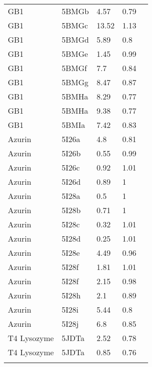 \begin{center}
\begin{tabular}{l l l l r}
GB1         & 5BMGb & 4.57  & 0.79 & \citep*{Cunningham2016} \\ 
GB1         & 5BMGc & 13.52 & 1.13 & \citep*{Cunningham2016} \\ 
GB1         & 5BMGd & 5.89  & 0.8  & \citep*{Cunningham2016} \\ 
GB1         & 5BMGe & 1.45  & 0.99 & \citep*{Cunningham2016} \\ 
GB1         & 5BMGf & 7.7   & 0.84 & \citep*{Cunningham2016} \\ 
GB1         & 5BMGg & 8.47  & 0.87 & \citep*{Cunningham2016} \\ 
GB1         & 5BMHa & 8.29  & 0.77 & \citep*{Cunningham2016} \\ 
GB1         & 5BMHa & 9.38  & 0.77 & \citep*{Cunningham2016} \\ 
GB1         & 5BMIa & 7.42  & 0.83 & \citep*{Cunningham2016} \\ 
Azurin      & 5I26a & 4.8   & 0.81 & \citep*{Consentius2016} \\ 
Azurin      & 5I26b & 0.55  & 0.99 & \citep*{Consentius2016} \\ 
Azurin      & 5I26c & 0.92  & 1.01 & \citep*{Consentius2016} \\ 
Azurin      & 5I26d & 0.89  & 1    & \citep*{Consentius2016} \\ 
Azurin      & 5I28a & 0.5   & 1    & \citep*{Consentius2016} \\ 
Azurin      & 5I28b & 0.71  & 1    & \citep*{Consentius2016} \\ 
Azurin      & 5I28c & 0.32  & 1.01 & \citep*{Consentius2016} \\ 
Azurin      & 5I28d & 0.25  & 1.01 & \citep*{Consentius2016} \\ 
Azurin      & 5I28e & 4.49  & 0.96 & \citep*{Consentius2016} \\ 
Azurin      & 5I28f & 1.81  & 1.01 & \citep*{Consentius2016} \\ 
Azurin      & 5I28f & 2.15  & 0.98 & \citep*{Consentius2016} \\ 
Azurin      & 5I28h & 2.1   & 0.89 & \citep*{Consentius2016} \\ 
Azurin      & 5I28i & 5.44  & 0.8  & \citep*{Consentius2016} \\ 
Azurin      & 5I28j & 6.8   & 0.85 & \citep*{Consentius2016} \\ 
T4 Lysozyme & 5JDTa & 2.52  & 0.78 & \citep*{Consentius2016} \\ 
T4 Lysozyme & 5JDTa & 0.85  & 0.76 & \citep*{Consentius2016} \\ 
\bottomrule \\
\end{tabular} 
\end{center}